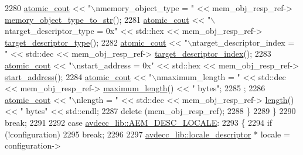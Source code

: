 \begin{DoxyCode}
2280             \hyperlink{cmd__line_8h_a0bc38ccc65c79ba06c6fcd7b4bf554c3}{atomic\_cout} << \textcolor{stringliteral}{"\(\backslash\)nmemory\_object\_type = "} << mem\_obj\_resp\_ref->
      \hyperlink{classavdecc__lib_1_1memory__object__descriptor__response_af51a87b0ff2644a9caaf6deba9869bc6}{memory\_object\_type\_to\_str}();
2281             \hyperlink{cmd__line_8h_a0bc38ccc65c79ba06c6fcd7b4bf554c3}{atomic\_cout} << \textcolor{stringliteral}{"\(\backslash\)ntarget\_descriptor\_type = 0x"} << std::hex << mem\_obj\_resp\_ref->
      \hyperlink{classavdecc__lib_1_1memory__object__descriptor__response_a032532c7dbbccc8502ceb8c8666df8f7}{target\_descriptor\_type}();
2282             \hyperlink{cmd__line_8h_a0bc38ccc65c79ba06c6fcd7b4bf554c3}{atomic\_cout} << \textcolor{stringliteral}{"\(\backslash\)ntarget\_descriptor\_index = "} << std::dec << mem\_obj\_resp\_ref->
      \hyperlink{classavdecc__lib_1_1memory__object__descriptor__response_af81691c2662f41ae30732f134950dc64}{target\_descriptor\_index}();
2283             \hyperlink{cmd__line_8h_a0bc38ccc65c79ba06c6fcd7b4bf554c3}{atomic\_cout} << \textcolor{stringliteral}{"\(\backslash\)nstart\_address = 0x"} << std::hex << mem\_obj\_resp\_ref->
      \hyperlink{classavdecc__lib_1_1memory__object__descriptor__response_ab812aec6523353c936be2a4019df1c1c}{start\_address}();
2284             \hyperlink{cmd__line_8h_a0bc38ccc65c79ba06c6fcd7b4bf554c3}{atomic\_cout} << \textcolor{stringliteral}{"\(\backslash\)nmaximum\_length = "} << std::dec << mem\_obj\_resp\_ref->
      \hyperlink{classavdecc__lib_1_1memory__object__descriptor__response_a36919f2d5c9feee8b27cf73fde079963}{maximum\_length}() << \textcolor{stringliteral}{" bytes"};
2285             ;
2286             \hyperlink{cmd__line_8h_a0bc38ccc65c79ba06c6fcd7b4bf554c3}{atomic\_cout} << \textcolor{stringliteral}{"\(\backslash\)nlength = "} << std::dec << mem\_obj\_resp\_ref->
      \hyperlink{classavdecc__lib_1_1memory__object__descriptor__response_a29753c4d47c3bab707360b33af66c1df}{length}() << \textcolor{stringliteral}{" bytes"} << std::endl;
2287             \textcolor{keyword}{delete} (mem\_obj\_resp\_ref);
2288         \}
2289     \}
2290     \textcolor{keywordflow}{break};
2291 
2292     \textcolor{keywordflow}{case} \hyperlink{namespaceavdecc__lib_ac7b7d227e46bc72b63ee9e9aae15902fafe9b509497773b71583f43c1de58e3e5}{avdecc\_lib::AEM\_DESC\_LOCALE}:
2293     \{
2294         \textcolor{keywordflow}{if} (!configuration)
2295             \textcolor{keywordflow}{break};
2296 
2297         \hyperlink{classavdecc__lib_1_1locale__descriptor}{avdecc\_lib::locale\_descriptor} * locale = configuration->

\end{DoxyCode}
